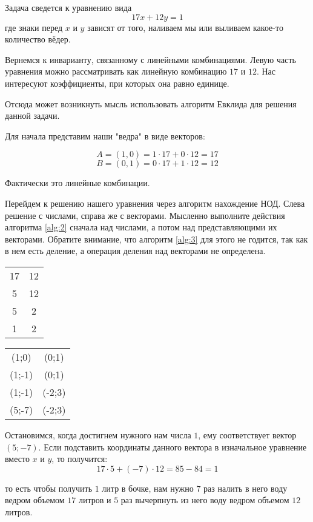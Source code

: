 \documentclass[russian]{lecture-notes}
\begin{document}
Задача сведется к уравнению вида
\[17x + 12y = 1\]
где знаки перед $x$ и $y$ зависят от того, наливаем мы или выливаем какое-то количество вёдер.

Вернемся к инварианту, связанному с линейными комбинациями. Левую часть уравнения можно рассматривать как линейную комбинацию $17$ и $12$. Нас интересуют коэффициенты, при которых она равно единице.

Отсюда может возникнуть мысль использовать алгоритм Евклида для решения данной задачи.


Для начала представим наши "ведра" в виде векторов:

\[A = (1,0) = 1 \cdot 17 + 0 \cdot 12 = 17\]
\[B = (0,1) = 0 \cdot 17 + 1 \cdot 12 = 12\]

Фактически это линейные комбинации.

Перейдем к решению нашего уравнения через алгоритм нахождение НОД. Слева решение с числами, справа же с векторами. Мысленно выполните действия алгоритма \ref{alg:2} сначала над числами, а потом над представляющими их векторами. Обратите внимание, что алгоритм \ref{alg:3} для этого не годится, так как в нем есть деление, а операция деления над векторами не определена.

\begin{center}
    \begin{tabular}{|c|c|}
        \hline
        17 & 12 \\
        5 & 12 \\
        5 & 2 \\
        1 & 2 \\
        \hline
    \end{tabular}
    \quad
    \begin{tabular}{|c|c|}
        \hline
        (1;0) & (0;1) \\
        (1;-1) & (0;1) \\
        (1;-1) &  (-2;3)\\
        (5;-7) &  (-2;3) \\
        \hline
    \end{tabular}
\end{center}

Остановимся, когда достигнем нужного нам числа $1$, ему соответствует вектор $(5;-7)$. Если подставить координаты данного вектора в изначальное уравнение вместо $x$ и $y$, то получится:
\[17 \cdot 5 + (-7) \cdot 12 = 85 - 84 = 1\]

то есть чтобы получить $1$ литр в бочке, нам нужно $7$ раз налить в него воду ведром объемом $17$ литров и $5$ раз вычерпнуть из него воду ведром объемом $12$ литров.
\end{document}
